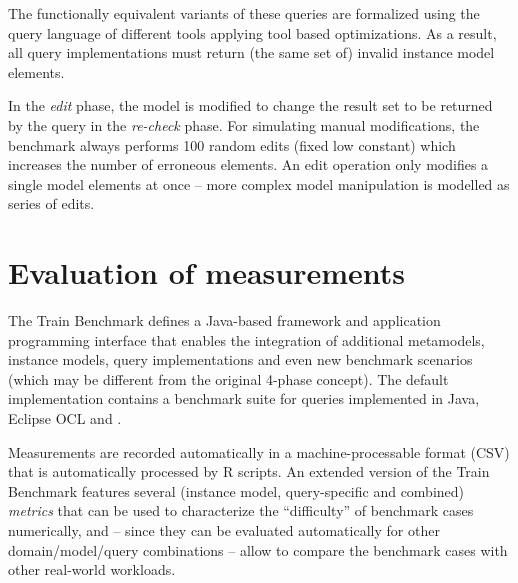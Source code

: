 The functionally equivalent variants of these queries are formalized using the
query language of different tools applying tool based optimizations. As a
result, all query implementations must return (the same set of) invalid instance
model elements.
 
In the \emph{edit} phase, the model is modified to change the result set to be
returned by the query in the \emph{re-check} phase. For simulating manual
modifications, the benchmark always performs 100 random edits (fixed low
constant) which increases the number of erroneous elements. An edit operation
only modifies a single model elements at once  -- more complex model manipulation is
modelled as series of edits.

\section{Evaluation of measurements}
The Train Benchmark defines a Java-based framework and application programming
interface that enables the integration of additional metamodels, instance
models, query implementations and even new benchmark scenarios (which may be
different from the original 4-phase concept). The default implementation
contains a benchmark suite for queries implemented in Java, Eclipse OCL and
\incquery{}.

Measurements are recorded automatically in a machine-processable format (CSV)
that is automatically processed by R \cite{TB:R} scripts. An extended version of the Train
Benchmark \cite{TB:ASE2013} features several (instance model, query-specific and
combined) \emph{metrics} that can be used to characterize the ``difficulty'' of
benchmark cases numerically, and -- since they can be evaluated automatically
for other domain/model/query combinations -- allow to compare the benchmark
cases with other real-world workloads.
